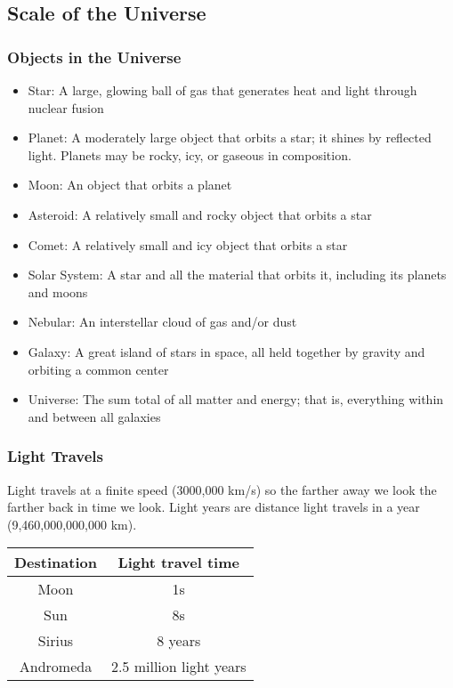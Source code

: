 \subsection{Scale of the Universe}
\subsubsection{Objects in the Universe}
\begin{itemize}
\item Star:  A large, glowing ball of gas that generates heat and light through nuclear fusion
\item Planet: A moderately large object that orbits a star; it shines by reflected light. Planets may be rocky, icy, or gaseous in composition.
\item Moon: An object that orbits a planet
\item Asteroid: A relatively small and rocky object that orbits a star
\item Comet: A relatively small and icy object that orbits a star
\item Solar System: A star and all the material that orbits it, including its planets and moons
\item Nebular: An interstellar cloud of gas and/or dust
\item Galaxy: A great island of stars in space, all held together by gravity and orbiting a common center
\item Universe: The sum total of all matter and energy; that is, everything within and between all galaxies
\end{itemize}

\subsubsection{Light Travels}
Light travels at a finite speed (3000,000 km/s) so the farther away we look the farther back in time we look. Light years are distance light travels in a year (9,460,000,000,000 km).
\begin{center}
\begin{tabular}{|c|c|}
    \hline
    \textbf{Destination} & \textbf{Light travel time}\\
    \hline
    Moon & 1s\\
    \hline
    Sun & 8s\\
    \hline
    Sirius & 8 years\\
    Andromeda & 2.5 million light years\\
    \hline
\end{tabular}
\end{center}


